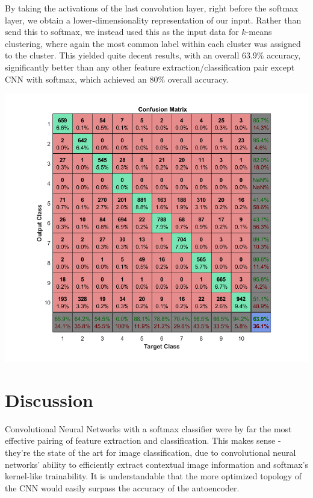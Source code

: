 \documentclass[11pt]{article}
\begin{document}
By taking the activations of the last convolution layer, right before the softmax layer, we obtain a lower-dimensionality representation of our input. Rather than send this to softmax, we instead used this as the input data for $k$-means clustering, where again the most common label within each cluster was assigned to the cluster. This yielded quite decent results, with an overall 63.9\% accuracy, significantly better than any other feature extraction/classification pair except CNN with softmax, which achieved an 80\% overall accuracy.
\begin{center}
\includegraphics[scale=0.4]{convnet_kmeans.png}
\end{center}


\section{Discussion}
Convolutional Neural Networks with a softmax classifier were by far the most effective pairing of feature extraction and classification. This makes sense - they're the state of the art for image classification, due to convolutional neural networks' ability to efficiently extract contextual image information and softmax's kernel-like trainability. It is understandable that the more optimized topology of the CNN would easily surpass the accuracy of the autoencoder.
\end{document}
